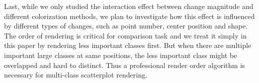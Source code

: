 Last, while we only studied the interaction effect between change magnitude and different colorization methods, we plan to investigate how this effect is influenced by different types of changes, such as point number, center position and shape.
The order of rendering is critical for comparison task and we treat it simply in this paper by rendering less important classes first. But when there are multiple important large classes at same positions, the less important class might be overlapped and hard to distinct. Thus a professional render order algorithm is necessary for multi-class scatterplot rendering.
